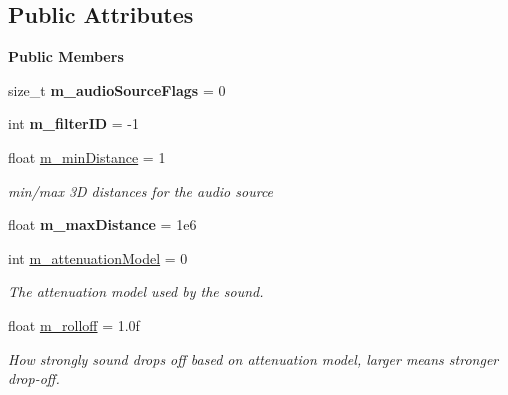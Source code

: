 \subsection*{Public Attributes}
\begin{Indent}\textbf{ Public Members}\par
\begin{DoxyCompactItemize}
\item 
\mbox{\label{structrev_1_1_audio_source_settings_acf4d2364ddadc2b30ea09021c337e475}} 
size\+\_\+t {\bfseries m\+\_\+audio\+Source\+Flags} = 0
\item 
\mbox{\label{structrev_1_1_audio_source_settings_adab5aa20e9aea522d0e85515aef60c52}} 
int {\bfseries m\+\_\+filter\+ID} = -\/1
\item 
float \mbox{\hyperlink{structrev_1_1_audio_source_settings_ab5ecfddf3e20a49f72d98a79eb2048ad}{m\+\_\+min\+Distance}} = 1
\begin{DoxyCompactList}\small\item\em min/max 3D distances for the audio source \end{DoxyCompactList}\item 
\mbox{\label{structrev_1_1_audio_source_settings_a530fba25c40690ea6d0c423f1c4f945d}} 
float {\bfseries m\+\_\+max\+Distance} = 1e6
\item 
int \mbox{\hyperlink{structrev_1_1_audio_source_settings_a3a69739a104b204a4836b60f5c71b9ea}{m\+\_\+attenuation\+Model}} = 0
\begin{DoxyCompactList}\small\item\em The attenuation model used by the sound. \end{DoxyCompactList}\item 
\mbox{\label{structrev_1_1_audio_source_settings_aceaf6614f2469fed19bc1fdba36870bb}} 
float \mbox{\hyperlink{structrev_1_1_audio_source_settings_aceaf6614f2469fed19bc1fdba36870bb}{m\+\_\+rolloff}} = 1.\+0f
\begin{DoxyCompactList}\small\item\em How strongly sound drops off based on attenuation model, larger means stronger drop-\/off. \end{DoxyCompactList}\item 

\end{DoxyCompactItemize}
\end{Indent}
